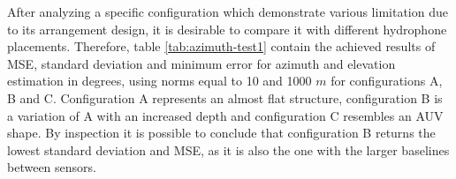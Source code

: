 After analyzing a specific configuration which demonstrate various limitation due to its arrangement design, it is desirable to compare it with different hydrophone placements. Therefore, table \ref{tab:azimuth-test1} contain the achieved results of MSE, standard deviation and minimum error for azimuth and elevation estimation in degrees, using norms equal to 10 and 1000 $m$ for configurations A, B and C. Configuration A represents an almost flat structure, configuration B is a variation of A with an increased depth and configuration C resembles an AUV shape. By inspection it is possible to conclude that configuration B returns the lowest standard deviation and MSE, as it is also the one with the larger baselines between sensors.

\begin{table}[!htbp] %
	\begin{center}
		\caption{Comparison of obtained errors for different configurations}
		\label{tab:azimuth-test1}
	\end{center}
\end{table}

